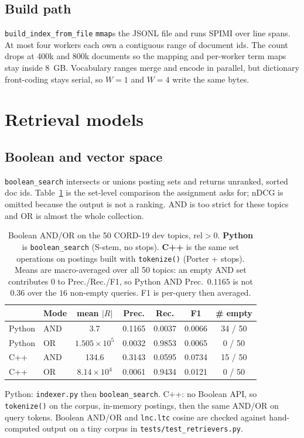 \documentclass[10pt,a4paper]{article}
\begin{document}
\subsection{Build path}
\texttt{build\_index\_from\_file} \texttt{mmap}s the JSONL file and runs SPIMI over
line spans. At most four workers each own a contiguous range of document ids. The
count drops at 400k and 800k documents so the mapping and per-worker term maps stay
inside 8~GB. Vocabulary ranges merge and encode in parallel, but dictionary
front-coding stays serial, so $W{=}1$ and $W{=}4$ write the same bytes.

\section{Retrieval models}

\subsection{Boolean and vector space}
\texttt{boolean\_search} intersects or unions posting sets and returns unranked,
sorted doc ids. Table~\ref{tab:bool} is the set-level comparison the assignment asks
for; nDCG is omitted because the output is not a ranking. AND is too strict for these
topics and OR is almost the whole collection.

\begin{table}[ht]\centering\footnotesize
\renewcommand{\arraystretch}{1.0}
\caption{Boolean AND/OR on the 50 CORD-19 dev topics, $\mathrm{rel}>0$.
\textbf{Python} is \texttt{boolean\_search} (S-stem, no stops). \textbf{C++} is the
same set operations on postings built with \texttt{tokenize()} (Porter + stops).
Means are macro-averaged over all 50 topics: an empty AND set contributes $0$
to Prec./Rec./F1, so Python AND Prec.\ $0.1165$ is not $0.36$ over the $16$
non-empty queries. F1 is per-query then averaged.}
\label{tab:bool}
\begin{tabular}{llccccc}
\toprule
 & Mode & mean $|R|$ & Prec. & Rec. & F1 & \# empty\\
\midrule
Python & AND & 3.7 & 0.1165 & 0.0037 & 0.0066 & 34 / 50\\
Python & OR  & $1.505\times10^{5}$ & 0.0032 & 0.9853 & 0.0065 & 0 / 50\\
C++ & AND & 134.6 & 0.3143 & 0.0595 & 0.0734 & 15 / 50\\
C++ & OR  & $8.14\times10^{4}$ & 0.0061 & 0.9434 & 0.0121 & 0 / 50\\
\bottomrule
\end{tabular}
\end{table}
Python: \texttt{indexer.py} then \texttt{boolean\_search}. C++: no Boolean API, so
\texttt{tokenize()} on the corpus, in-memory postings, then the same AND/OR on query
tokens. Boolean AND/OR and \texttt{lnc.ltc} cosine are checked against hand-computed
output on a tiny corpus in \texttt{tests/test\_retrievers.py}.
\end{document}
